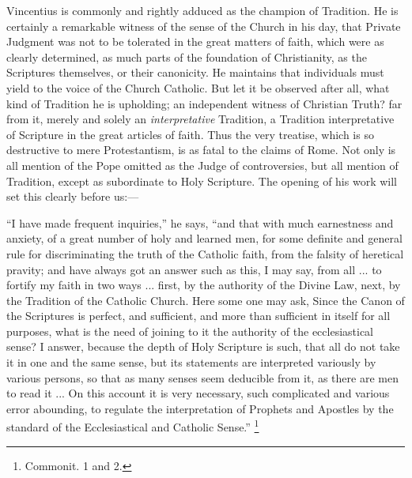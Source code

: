 Vincentius is commonly and rightly adduced as the champion of
Tradition. He is certainly a remarkable witness of the sense of the
Church in his day, that Private Judgment was not to be tolerated in
the great matters of faith, which were as clearly determined, as much
parts of the foundation of Christianity, as the Scriptures themselves,
or their canonicity. He maintains that individuals must yield to the
voice of the Church Catholic. But let it be observed after all, what
kind of Tradition he is upholding; an independent witness of Christian
Truth? far from it, merely and solely an \emph{interpretative}
Tradition, a Tradition interpretative of Scripture in the great
articles of faith. Thus the very treatise, which is so destructive to
mere Protestantism, is as fatal to the claims of Rome. Not only is all
mention of the Pope omitted as the Judge of controversies, but all
mention of Tradition, except as subordinate to Holy Scripture. The
opening of his work will set this clearly before us:—

``I have made frequent inquiries,'' he says, ``and that
with much earnestness and anxiety, of a great number of holy and
learned men, for some definite and general rule for discriminating the
truth of the Catholic faith, from the falsity of heretical pravity;
and have always got an answer such as this, I may say, from all ... to
fortify my faith in two ways ... first, by the authority of the Divine
Law, next, by the Tradition of the Catholic Church. Here some one may
ask, Since the Canon of the Scriptures is perfect, and sufficient, and
more than sufficient in itself for all purposes, what is the need of
joining to it the authority of the ecclesiastical sense? I answer,
because the depth of Holy Scripture is such, that all do not take it
in one and the same sense, but its statements are interpreted
variously by various persons, so that as many senses seem deducible
from it, as there are men to read it ... On this account it is very
necessary, such complicated and various error abounding, to regulate
the interpretation of Prophets and Apostles by the standard of the
Ecclesiastical and Catholic Sense.'' \footnote{Commonit. 1 and 2.}

